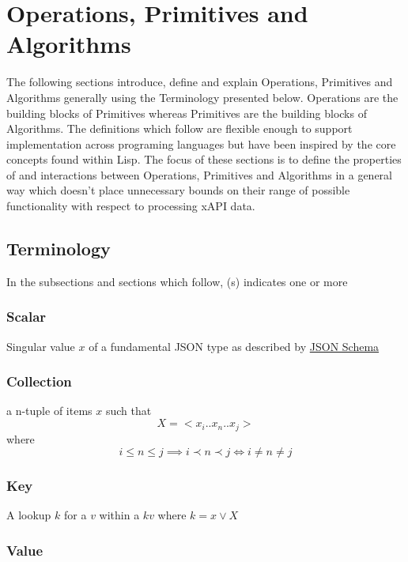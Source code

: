 \documentclass[../main.tex]{subfiles}
\begin{document}
\section{Operations, Primitives and Algorithms}
The following sections introduce, define and explain Operations, Primitives and Algorithms generally using the Terminology presented below. Operations are the building blocks of Primitives whereas Primitives are the building blocks of Algorithms. The definitions which follow are flexible enough to support implementation across programing languages but have been inspired by the core concepts found within Lisp. The focus of these sections is to define the properties of and interactions between Operations, Primitives and Algorithms in a general way which doesn't place unnecessary bounds on their range of possible functionality with respect to processing xAPI data.

\subsection{Terminology}

In the subsections and sections which follow, (s) indicates one or more

\subsubsection{Scalar}

Singular value $x$ of a fundamental JSON type as described by \href{https://json-schema.org/understanding-json-schema/reference/type.html}{JSON Schema}

\subsubsection{Collection}

a n-tuple of items $x$ such that
$$X = <x_{i}..x_{n}..x_{j}>$$
where
$$i \leq n \leq j \implies i \prec n \prec j \iff i \not= n \not= j$$

\subsubsection{Key}

A lookup $k$ for a $v$ within a $kv$ where $k = x \lor X$

\subsubsection{Value}
\end{document}
